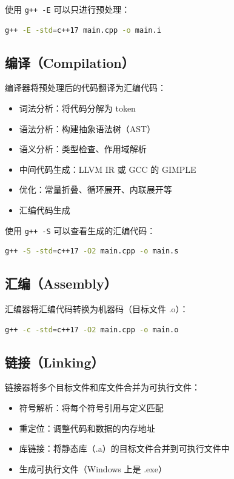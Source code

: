 ﻿\documentclass[12pt,a4paper,oneside]{ctexbook}
\begin{document}
使用 \texttt{g++ -E} 可以只进行预处理：
\begin{lstlisting}[language=bash]
g++ -E -std=c++17 main.cpp -o main.i
\end{lstlisting}

\subsection{编译（Compilation）}

编译器将预处理后的代码翻译为汇编代码：
\begin{itemize}
    \item 词法分析：将代码分解为 token
    \item 语法分析：构建抽象语法树（AST）
    \item 语义分析：类型检查、作用域解析
    \item 中间代码生成：LLVM IR 或 GCC 的 GIMPLE
    \item 优化：常量折叠、循环展开、内联展开等
    \item 汇编代码生成
\end{itemize}

使用 \texttt{g++ -S} 可以查看生成的汇编代码：
\begin{lstlisting}[language=bash]
g++ -S -std=c++17 -O2 main.cpp -o main.s
\end{lstlisting}

\subsection{汇编（Assembly）}

汇编器将汇编代码转换为机器码（目标文件 .o）：
\begin{lstlisting}[language=bash]
g++ -c -std=c++17 -O2 main.cpp -o main.o
\end{lstlisting}

\subsection{链接（Linking）}

链接器将多个目标文件和库文件合并为可执行文件：
\begin{itemize}
    \item 符号解析：将每个符号引用与定义匹配
    \item 重定位：调整代码和数据的内存地址
    \item 库链接：将静态库（.a）的目标文件合并到可执行文件中
    \item 生成可执行文件（Windows 上是 .exe）
\end{itemize}
\end{document}
